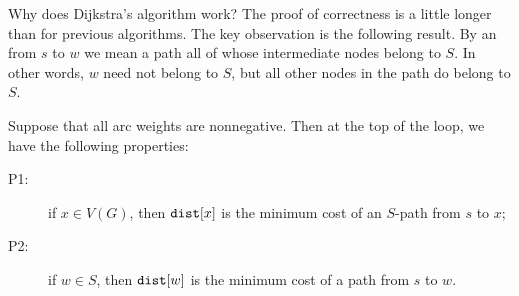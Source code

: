 Why does Dijkstra's algorithm work? The proof of correctness is a
little longer than for previous algorithms. The key observation is the
following result. By an  from $s$ to $w$ we mean a
path all of whose intermediate nodes belong to $S$. In other words, $w$
need not belong to $S$, but all other nodes in the path do belong to $S$.

\begin{Theorem}
\label{thm:dijkstra} Suppose that all arc weights are nonnegative. Then
at the top of the  loop, we have the following properties:
\begin{description}
\item[P1:] if $x\in V(G)$, then $\dist[x]$ is the minimum cost of an $S$-path 
from $s$ to $x$;
\item[P2:] if $w\in S$, then $\dist[w]$ is the minimum cost of a path
from $s$ to $w$.
\end{description}
\end{Theorem}

